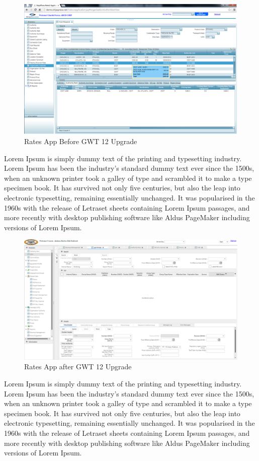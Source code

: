 \documentclass[12pt,a4paper]{report}
\begin{document}
\begin{figure}[H]
\centering
\includegraphics[scale=.5]{RatesGWT4.png}
  \caption{Rates App Before GWT 12 Upgrade}
  \label{fig:RatesGWT4}
\end{figure}
Lorem Ipsum is simply dummy text of the printing and typesetting industry. Lorem Ipsum has been the industry's standard dummy text ever since the 1500s, when an unknown printer took a galley of type and scrambled it to make a type specimen book. It has survived not only five centuries, but also the leap into electronic typesetting, remaining essentially unchanged. It was popularised in the 1960s with the release of Letraset sheets containing Lorem Ipsum passages, and more recently with desktop publishing software like Aldus PageMaker including versions of Lorem Ipsum.
\begin{figure}[H]
\centering
\includegraphics[scale=.4]{RatesGWT12.png}
  \caption{Rates App after GWT 12 Upgrade}
  \label{fig:RatesGWT12}
\end{figure}

Lorem Ipsum is simply dummy text of the printing and typesetting industry. Lorem Ipsum has been the industry's standard dummy text ever since the 1500s, when an unknown printer took a galley of type and scrambled it to make a type specimen book. It has survived not only five centuries, but also the leap into electronic typesetting, remaining essentially unchanged. It was popularised in the 1960s with the release of Letraset sheets containing Lorem Ipsum passages, and more recently with desktop publishing software like Aldus PageMaker including versions of Lorem Ipsum.
\end{document}

